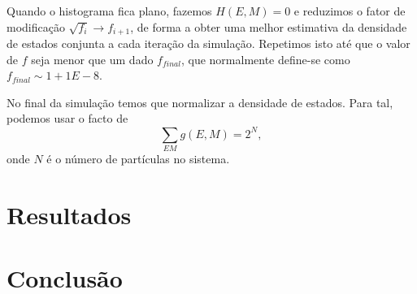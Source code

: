 \documentclass[12pt, a4paper]{article}
\begin{document}
Quando o histograma fica plano, fazemos $H(E, M) = 0$ e reduzimos o fator de modificação $\sqrt{f_{i}} \rightarrow f_{i+1}$, de forma a obter uma melhor estimativa da densidade de estados conjunta a cada iteração da simulação. Repetimos isto até que o valor de $f$ seja menor que um dado $f_{final}$, que normalmente define-se como $f_{final}  \sim 1+1E-8$.

No final da simulação temos que normalizar a densidade de estados. Para tal, podemos usar o facto de 
\begin{equation}
	\sum_{EM} g(E,M) = 2^N,
\end{equation}
onde $N$ é o número de partículas no sistema.


	
	\section{Resultados}
	
	
	\section{Conclusão}
	
	\newpage
		
	
	
\end{document}
